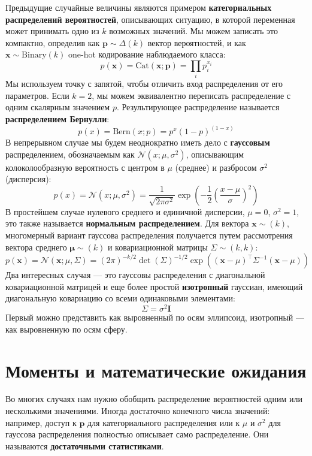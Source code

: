 Предыдущие случайные величины являются примером \textbf{категориальных распределений вероятностей}, описывающих ситуацию, в которой переменная может принимать одно из $k$ возможных значений. Мы можем записать это компактно, определив как $\mathbf{p} \sim \Delta(k)$ вектор вероятностей, и как $\mathbf{x} \sim \text{Binary}(k)$ one-hot кодирование наблюдаемого класса:
%
$$
p(\mathbf{x})=\text{Cat}(\mathbf{x}; \mathbf{p})=\prod_ip_i^{x_i}
$$
%
Мы используем точку с запятой, чтобы отличить вход распределения от его параметров. Если $k=2$, мы можем эквивалентно переписать распределение с одним скалярным значением $p$. Результирующее распределение называется \textbf{распределением Бернулли}:
%
$$
p(x)=\text{Bern}(x; p)= p^x(1-p)^{(1-x)}
$$
%
В непрерывном случае мы будем неоднократно иметь дело с \textbf{гауссовым} распределением, обозначаемым как $\mathcal{N}(x; \mu, \sigma^2)$, описывающим колоколообразную вероятность с центром в $\mu$ (среднее) и разбросом $\sigma^2$ (дисперсия):
%
$$
p(x)=\mathcal{N}(x;\mu,\sigma^2)= \frac{1}{\sqrt{2\pi \sigma^2}}\exp\left(-\frac{1}{2}\left(\frac{x-\mu}{\sigma}\right)^2\right)
$$
%
В простейшем случае нулевого среднего и единичной дисперсии, $\mu=0$, $\sigma^2=1$, это также называется \textbf{нормальным распределением}. Для вектора $\mathbf{x} \sim (k)$, многомерный вариант гауссова распределения получается путем рассмотрения вектора среднего $\mathbf{\mu} \sim (k)$ и ковариационной матрицы $\Sigma \sim (k,k)$:
%
$$
p(\mathbf{x})=\mathcal{N}(\mathbf{x};\mu, \Sigma)= \left(2\pi\right)^{-k/2}\det(\Sigma)^{-1/2}\exp\left((\mathbf{x}-\mu)^\top\Sigma^{-1}(\mathbf{x}-\mu)\right)
$$
%
Два интересных случая — это гауссовы распределения с диагональной ковариационной матрицей и еще более простой \textbf{изотропный} гауссиан, имеющий диагональную ковариацию со всеми одинаковыми элементами:
%
$$
\Sigma=\sigma^2\mathbf{I}
$$
%
Первый можно представить как выровненный по осям эллипсоид, изотропный — как выровненную по осям сферу.

\section{Моменты и математические ожидания}

Во многих случаях нам нужно обобщить распределение вероятностей одним или несколькими значениями. Иногда достаточно конечного числа значений: например, доступ к $\mathbf{p}$ для категориального распределения или к $\mu$ и $\sigma^2$ для гауссова распределения полностью описывает само распределение. Они называются \textbf{достаточными статистиками}. 

